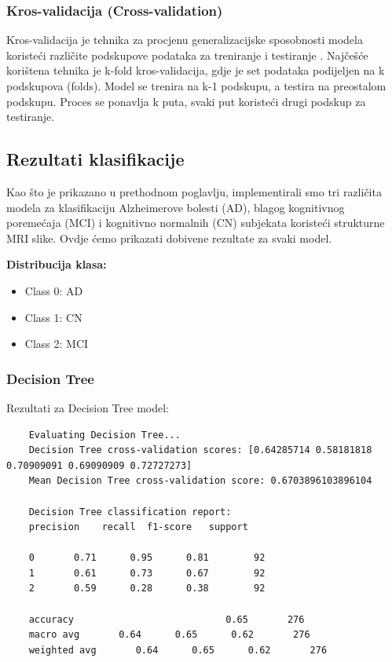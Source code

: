 \documentclass[zavrsnirad]{fer}
\begin{document}
\subsubsection{Kros-validacija (Cross-validation)}

Kros-validacija je tehnika za procjenu generalizacijske sposobnosti modela koristeći različite podskupove podataka za treniranje i testiranje \cite{medium_confusion_matrix} \cite{towardsdatascience_confusion_matrix}. Najčešće korištena tehnika je k-fold kros-validacija, gdje je set podataka podijeljen na k podskupova (folds). Model se trenira na k-1 podskupu, a testira na preostalom podskupu. Proces se ponavlja k puta, svaki put koristeći drugi podskup za testiranje.

\subsection{Rezultati klasifikacije}

Kao što je prikazano u prethodnom poglavlju, implementirali smo tri različita modela za klasifikaciju Alzheimerove bolesti (AD), blagog kognitivnog poremećaja (MCI) i kognitivno normalnih (CN) subjekata koristeći strukturne MRI slike. Ovdje ćemo prikazati dobivene rezultate za svaki model.

\noindent \textbf{Distribucija klasa:}
\begin{itemize}
	\item Class 0: AD
	\item Class 1: CN
	\item Class 2: MCI
\end{itemize}

\subsubsection{Decision Tree}

Rezultati za Decision Tree model:

\begin{verbatim}
	Evaluating Decision Tree...
	Decision Tree cross-validation scores: [0.64285714 0.58181818 0.70909091 0.69090909 0.72727273]
	Mean Decision Tree cross-validation score: 0.6703896103896104
	
	Decision Tree classification report:
	precision    recall  f1-score   support
	
	0       0.71      0.95      0.81        92
	1       0.61      0.73      0.67        92
	2       0.59      0.28      0.38        92
	
	accuracy                           0.65       276
	macro avg       0.64      0.65      0.62       276
	weighted avg       0.64      0.65      0.62       276
	
\end{verbatim}
\end{document}
